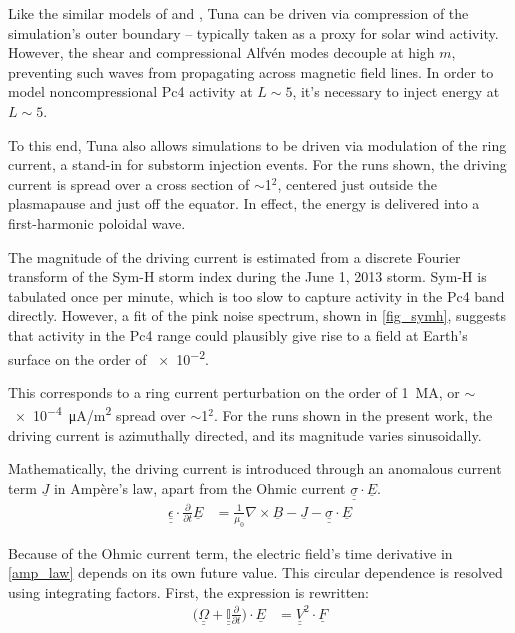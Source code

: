 \documentclass{article}
\newcommand{\about}{\ensuremath{\sim}}
\newcommand{\Alfven}{Alfv\'en\xspace}
\newcommand{\Ampere}{Amp\`ere\xspace}
\renewcommand{\vec}[1]{\ensuremath{\underline{#1}}}
\newcommand{\tensor}[1]{\ensuremath{\underline{\underline{#1}}}}
\newcommand{\dd}[1]{\ensuremath{ \frac{\partial}{\partial #1} }\xspace}
\newcommand{\ddt}{\dd{t}\xspace}
\newcommand{\curl}[1]{\ensuremath{ \nabla \times \vec{#1} }\xspace}
\newcommand{\azm}{\ensuremath{m}\xspace}
\newcommand{\mz}{\ensuremath{\mu_0}\xspace}
\newcommand{\oomz}{\ensuremath{ \frac{1}{\mz} }\xspace}
\begin{document}
Like the similar models of \cite{lysak_2013} and \cite{waters_2013}, Tuna can be driven via compression of the simulation's outer boundary -- typically taken as a proxy for solar wind activity. However, the shear and compressional \Alfven modes decouple at high \azm, preventing such waves from propagating across magnetic field lines. In order to model noncompressional Pc4 activity at $L\about5$, it's necessary to inject energy at $L\about5$.

To this end, Tuna also allows simulations to be driven via modulation of the ring current, a stand-in for substorm injection events. For the runs shown, the driving current is spread over a cross section of \about\SI{1}{\RE}$^2$, centered just outside the plasmapause and just off the equator. In effect, the energy is delivered into a first-harmonic poloidal wave.

The magnitude of the driving current is estimated from a discrete Fourier transform of the Sym-H storm index during the June 1, 2013 storm. Sym-H is tabulated once per minute, which is too slow to capture activity in the Pc4 band directly. However, a fit of the pink noise spectrum, shown in \cref{fig_symh}, suggests that activity in the Pc4 range could plausibly give rise to a field at Earth's surface on the order of \SI{e-2}{\nT}.

This corresponds to a ring current perturbation on the order of \SI{1}{\mega\A}, or \about\SI{e-4}{\uA/\m\squared} spread over \about\SI{1}{\RE}$^2$. For the runs shown in the present work, the driving current is azimuthally directed, and its magnitude varies sinusoidally.


Mathematically, the driving current is introduced through an anomalous current term $\vec{J}$ in \Ampere's law, apart from the Ohmic current ${\tensor{\sigma} \cdot \vec{E}}$.
\begin{align}
    \label{amp_law}
    \tensor{\epsilon} \cdot \ddt \vec{E} &= \oomz \curl{B} - \vec{J}
      - \tensor{\sigma} \cdot \vec{E}
\end{align}

Because of the Ohmic current term, the electric field's time derivative in \cref{amp_law} depends on its own future value. This circular dependence is resolved using integrating factors. First, the expression is rewritten:
\begin{align}
    \label{int_fac}
    \Big( \tensor{\Omega} + \tensor{ \mathbb{I} }\ddt \Big) \cdot
        \vec{E} &= \tensor{V}^2 \cdot \vec{F}
\end{align}
\end{document}
